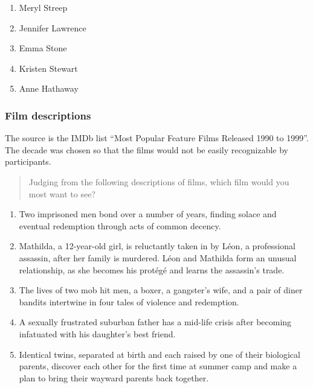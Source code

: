 \documentclass[11pt,letter]{amsart}
\begin{document}
\begin{enumerate}
\item Meryl Streep 

\item Jennifer Lawrence 

\item Emma Stone 

\item Kristen Stewart 

\item Anne Hathaway
\end{enumerate}

\subsubsection{Film descriptions}

The source is the IMDb list ``Most Popular Feature Films Released 1990 to
1999''. The decade was chosen so that the films would not be easily
recognizable by participants.

\begin{quotation}
Judging from the following descriptions of films, which film would you most
want to see?
\end{quotation}

\begin{enumerate}
\item Two imprisoned men bond over a number of years, finding solace and
eventual redemption through acts of common decency. 

\item Mathilda, a 12-year-old girl, is reluctantly taken in by L\'eon, a
professional assassin, after her family is murdered. L\'eon and Mathilda
form an unusual relationship, as she becomes his prot\'eg\'e and learns the
assassin's trade. 

\item The lives of two mob hit men, a boxer, a gangster's wife, and a pair
of diner bandits intertwine in four tales of violence and redemption. 

\item A sexually frustrated suburban father has a mid-life crisis after
becoming infatuated with his daughter's best friend. 

\item Identical twins, separated at birth and each raised by one of their
biological parents, discover each other for the first time at summer camp
and make a plan to bring their wayward parents back together.
\end{enumerate}
\end{document}
